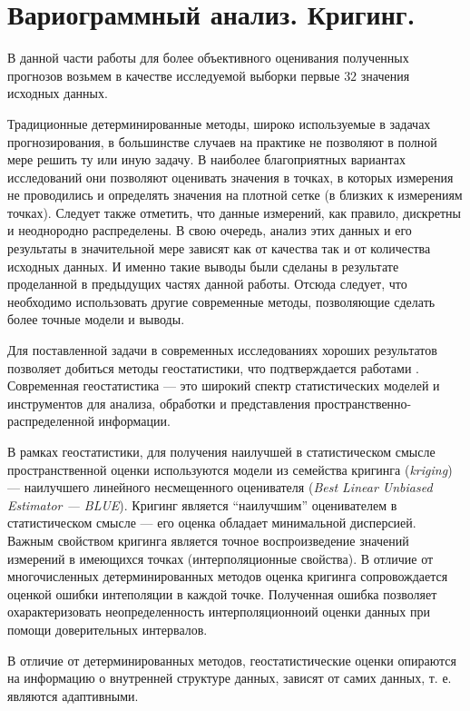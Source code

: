 
\section{Вариограммный анализ. Кригинг.} %
\label{sec:_variogram}

В данной части работы для более объективного оценивания полученных прогнозов возьмем в качестве исследуемой выборки первые $32$ значения исходных данных.

Традиционные детерминированные методы, широко используемые в задачах прогнозирования, в большинстве случаев на практике не позволяют в полной мере решить ту или иную задачу. В наиболее благоприятных вариантах исследований они позволяют оценивать значения в точках, в которых измерения не проводились и определять значения на плотной сетке (в близких к измерениям точках). Следует также отметить, что данные измерений, как правило, дискретны и неоднородно распределены. В свою очередь, анализ этих данных и его результаты в значительной мере зависят как от качества так и от количества исходных данных. И именно такие выводы были сделаны в результате проделанной в предыдущих частях данной работы. Отсюда следует, что необходимо использовать другие современные методы, позволяющие сделать более точные модели и выводы.

Для поставленной задачи в современных исследованиях хороших результатов позволяет добиться методы геостатистики, что подтверждается работами \cite{GeoStCompar1987, GeoStCompar1998}. Современная геостатистика --- это широкий спектр статистических моделей и инструментов для анализа, обработки и представления пространственно-распределенной информации.

В рамках геостатистики, для получения наилучшей в статистическом смысле пространственной оценки используются модели из семейства кригинга (\textit{kriging}) --- наилучшего линейного несмещенного оценивателя (\textit{Best Linear Unbiased Estimator --- BLUE}). Кригинг является ``наилучшим'' оценивателем в статистическом смысле --- его оценка обладает минимальной дисперсией. Важным свойством кригинга является точное воспроизведение значений измерений в имеющихся точках (интерполяционные свойства). В отличие от многочисленных детерминированных методов оценка кригинга сопровождается оценкой ошибки интеполяции в каждой точке. Полученная ошибка позволяет охарактеризовать неопределенность интерполяционноий оценки данных при помощи доверительных интервалов.

В отличие от детерминированных методов, геостатистические оценки опираются на информацию о внутренней структуре данных, зависят от самих данных, т. е. являются адаптивными.

